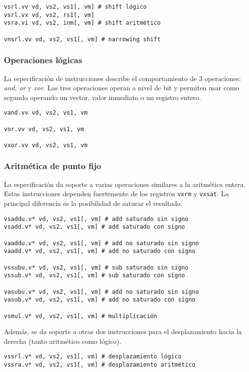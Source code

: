 \begin{lstlisting}
vsrl.vv vd, vs2, vs1[, vm] # shift lógico
vsrl.vx vd, vs2, rs1[, vm] 
vsra.vi vd, vs2, inm[, vm] # shift aritmético

vnsrl.vv vd, vs2, vs1[, vm] # narrowing shift
\end{lstlisting}


\subsubsection{Operaciones lógicas}

La especificación de instrucciones describe el comportamiento de 3 operaciones:
\textit{and, or} y \textit{xor}. Las tres operaciones operan a nivel de bit y
permiten usar como segundo operando un vector, valor inmediato o un registro
entero.

\begin{lstlisting}
vand.vv vd, vs2, vs1, vm

vor.vv vd, vs2, vs1, vm

vxor.vv vd, vs2, vs1, vm
\end{lstlisting}

\subsubsection{Aritmética de punto fijo}

La especificación da soporte a varias operaciones similares a la aritmética
entera. Estas instrucciones dependen fuertemente de los registros \texttt{vxrm}
y \texttt{vxsat}. La principal diferencia es la posibilidad de saturar el
resultado.

\begin{lstlisting}
vsaddu.v* vd, vs2, vs1[, vm] # add saturado sin signo
vsadd.v* vd, vs2, vs1[, vm] # add saturado con signo

vaaddu.v* vd, vs2, vs1[, vm] # add no saturado sin signo
vaadd.v* vd, vs2, vs1[, vm] # add no saturado con signo

vssubu.v* vd, vs2, vs1[, vm] # sub saturado sin signo
vssub.v* vd, vs2, vs1[, vm] # sub saturado con signo

vasubu.v* vd, vs2, vs1[, vm] # add no saturado sin signo
vasub.v* vd, vs2, vs1[, vm] # add no saturado con signo

vsmul.v* vd, vs2, vs1[, vm] # multiplicación

\end{lstlisting}

Además, se da soporte a otras dos instrucciones para el desplazamiento hacia la
derecha (tanto aritmético como lógico).
\begin{lstlisting}
vssrl.v* vd, vs2, vs1[, vm] # desplazamiento lógico
vssra.v* vd, vs2, vs1[, vm] # desplazamiento aritmético
\end{lstlisting}

